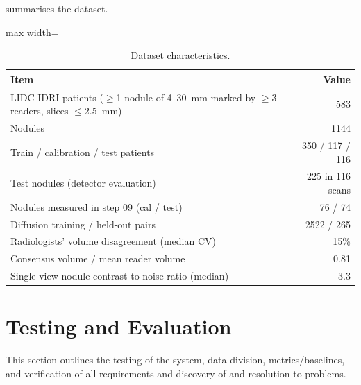 
 summarises the dataset.

\begin{table}[!htbp]
\centering\small
\caption{Dataset characteristics.}
\label{tab:data}
\begin{adjustbox}{max width=\linewidth}
\begin{tabular}{lr}
\toprule
Item & Value \\
\midrule
LIDC-IDRI patients ($\geq$1 nodule of 4--30~mm marked by $\geq$3 readers, slices $\leq$2.5~mm) & 583 \\
Nodules & \num{1144} \\
Train / calibration / test patients & 350 / 117 / 116 \\
Test nodules (detector evaluation) & 225 in 116 scans \\
Nodules measured in step 09 (cal / test) & 76 / 74 \\
Diffusion training / held-out pairs & \num{2522} / 265 \\
Radiologists' volume disagreement (median CV) & 15\% \\
Consensus volume / mean reader volume & 0.81 \\
Single-view nodule contrast-to-noise ratio (median) & 3.3 \\
\bottomrule
\end{tabular}
\end{adjustbox}
\end{table}


\section{Testing and Evaluation}

This section outlines the testing of the system, data division, metrics/baselines, and verification of all requirements and discovery of and resolution to problems.

